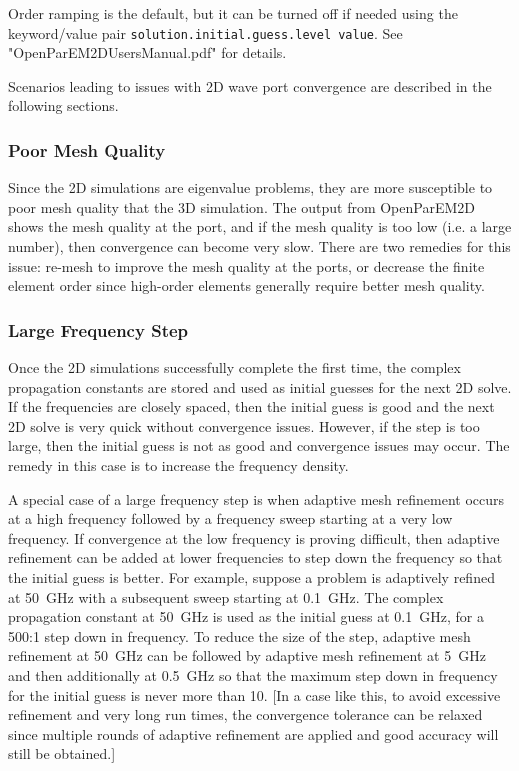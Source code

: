 \documentclass[titlepage]{article}
\renewcommand\_{\textunderscore\linebreak[1]}
\begin{document}
Order ramping is the default, but it can be turned off if needed using the keyword/value pair \newline\texttt{solution.initial.guess.level value}.  See "OpenParEM2D\_Users\_Manual.pdf" for details.

Scenarios leading to issues with 2D wave port convergence are described in the following sections.

\subsubsection{Poor Mesh Quality}

Since the 2D simulations are eigenvalue problems, they are more susceptible to poor mesh quality that the 3D simulation.  The output from OpenParEM2D shows the mesh quality at the port, and if the mesh quality is too low (i.e. a large number), then convergence can become very slow.  There are two remedies for this issue: re-mesh to improve the mesh quality at the ports, or decrease the finite element order since high-order elements generally require better mesh quality.

\subsubsection{Large Frequency Step}

Once the 2D simulations successfully complete the first time, the complex propagation constants are stored and used as initial guesses for the next 2D solve.  If the frequencies are closely spaced, then the initial guess is good and the next 2D solve is very quick without convergence issues.  However, if the step is too large, then the initial guess is not as good and convergence issues may occur.  The remedy in this case is to increase the frequency density.

A special case of a large frequency step is when adaptive mesh refinement occurs at a high frequency followed by a frequency sweep starting at a very low frequency.  If convergence at the low frequency is proving difficult, then adaptive refinement can be added at lower frequencies to step down the frequency so that the initial guess is better.  For example, suppose a problem is adaptively refined at 50~GHz with a subsequent sweep starting at 0.1~GHz.  The complex propagation constant at 50~GHz is used as the initial guess at 0.1~GHz, for a 500:1 step down in frequency.  To reduce the size of the step, adaptive mesh refinement at 50~GHz can be followed by adaptive mesh refinement at 5~GHz and then additionally at 0.5~GHz so that the maximum step down in frequency for the initial guess is never more than 10.  [In a case like this, to avoid excessive refinement and very long run times, the convergence tolerance can be relaxed since multiple rounds of adaptive refinement are applied and good accuracy will still be obtained.]
\end{document}
